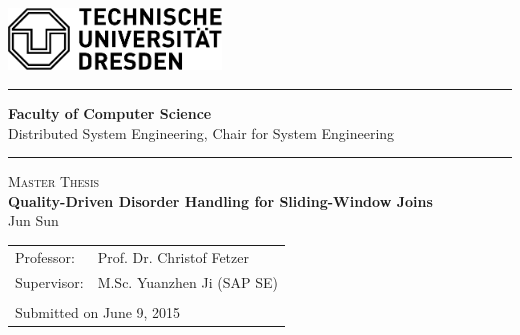 \documentclass[a4paper, 11pt, twoside]{report}
\date{{June 8, 2015}}
\begin{document}
\thispagestyle{empty}

\begin{flushleft}
	\includegraphics[height=1.65cm]{tu.pdf}
\end{flushleft}

\parindent0pt
\rule{140mm}{0.3mm}
\newline
\textbf{Faculty of Computer Science}\\ Distributed System Engineering, Chair for System Engineering
\newline
\rule[2.5mm]{140mm}{0.3mm}

\begin{center}
	\vspace{2cm}
	\Large
	\textsc{Master Thesis}\\
	
	\vspace{1cm}
	\LARGE
	\textbf{Quality-Driven Disorder Handling for Sliding-Window Joins}\\
	\vspace{2cm}
	\Large
	Jun Sun\\
\end{center}

\begin{flushleft}
	\vspace{4cm}
	\begin{tabular}{ll}
	Professor:  & Prof. Dr.  Christof Fetzer\\
	Supervisor: & M.Sc. Yuanzhen Ji (SAP SE) \\
	\\
	\multicolumn{2}{l}{Submitted on  June 9, 2015} \\
	\end{tabular}
\end{flushleft}
\cleardoublepage


\cleardoublepage



\cleardoublepage
\end{document}
